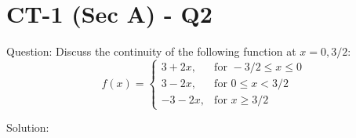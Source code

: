 \documentclass[11pt, a4paper]{article}
\begin{document}


\section*{CT-1 (Sec A) - Q2}

Question:
Discuss the continuity of the following function at $x = 0, 3/2$:
\[ 
f(x) = \begin{cases} 
3+2x, & \text{for } -3/2 \le x \le 0 \\ 
3-2x, & \text{for } 0 \le x < 3/2 \\ 
-3-2x, & \text{for } x \ge 3/2 
\end{cases} 
\]

Solution:
\end{document}
